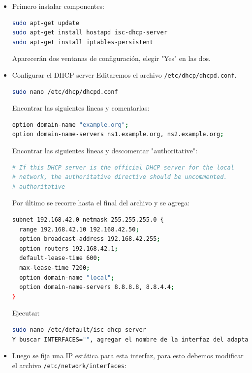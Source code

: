 \begin{itemize}

\item Primero instalar componentes:

\begin{lstlisting}[language=bash]
sudo apt-get update
sudo apt-get install hostapd isc-dhcp-server
sudo apt-get install iptables-persistent
\end{lstlisting}

Aparecerán dos ventanas de configuración, elegir "Yes" en las dos.
\item Configurar el DHCP server
Editaremos el archivo \lstinline[columns=fixed]{/etc/dhcp/dhcpd.conf}.

\begin{lstlisting}[language=bash]
sudo nano /etc/dhcp/dhcpd.conf
\end{lstlisting}

Encontrar las siguientes líneas y comentarlas:

\begin{lstlisting}[language=bash]
option domain-name "example.org";
option domain-name-servers ns1.example.org, ns2.example.org;
\end{lstlisting}

Encontrar las siguientes líneas y descomentar "authoritative":

\begin{lstlisting}[language=bash]
# If this DHCP server is the official DHCP server for the local
# network, the authoritative directive should be uncommented.
# authoritative
\end{lstlisting}

Por último se recorre hasta el final del archivo y se agrega:

\begin{lstlisting}[language=bash]
subnet 192.168.42.0 netmask 255.255.255.0 { 
  range 192.168.42.10 192.168.42.50;
  option broadcast-address 192.168.42.255;
  option routers 192.168.42.1;
  default-lease-time 600;
  max-lease-time 7200;
  option domain-name "local";
  option domain-name-servers 8.8.8.8, 8.8.4.4;
}
\end{lstlisting}

Ejecutar:
\begin{lstlisting}[language=bash]
sudo nano /etc/default/isc-dhcp-server
Y buscar INTERFACES="", agregar el nombre de la interfaz del adaptador de WiFi.
\end{lstlisting}

\item Luego se fija una IP estática para esta interfaz, para esto debemos modificar el archivo \lstinline[columns=fixed]{/etc/network/interfaces}:


\end{itemize}
